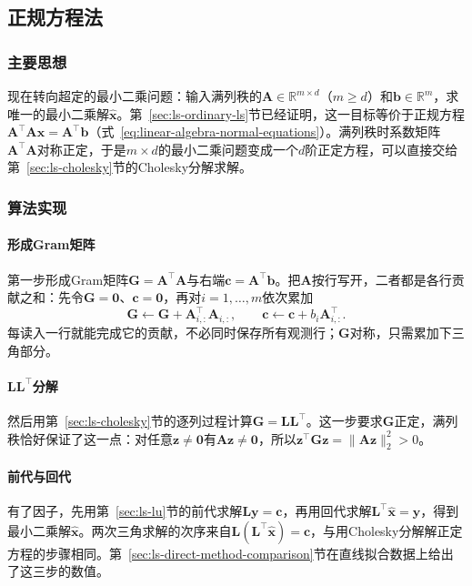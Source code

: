 \subsection{正规方程法}
\label{sec:ls-normal-equations-method}

\subsubsection{主要思想}

现在转向超定的最小二乘问题：输入满列秩的$\bm A\in\mathbb R^{m\times d}$（$m\geq d$）和$\bm b\in\mathbb R^m$，求唯一的最小二乘解$\hat{\bm x}$。第~\ref{sec:ls-ordinary-ls}节已经证明，这一目标等价于正规方程$\bm A^\top\bm A\hat{\bm x}=\bm A^\top\bm b$（式~\eqref{eq:linear-algebra-normal-equations}）。满列秩时系数矩阵$\bm A^\top\bm A$对称正定，于是$m\times d$的最小二乘问题变成一个$d$阶正定方程，可以直接交给第~\ref{sec:ls-cholesky}节的Cholesky分解求解。

\subsubsection{算法实现}

\paragraph{形成Gram矩阵}
第一步形成Gram矩阵$\bm G=\bm A^\top\bm A$与右端$\bm c=\bm A^\top\bm b$。把$\bm A$按行写开，二者都是各行贡献之和：先令$\bm G=\bm0$、$\bm c=\bm0$，再对$i=1,\ldots,m$依次累加
\[
 \bm G\leftarrow\bm G+\bm A_{i,:}^\top\bm A_{i,:},\qquad
 \bm c\leftarrow\bm c+b_i\bm A_{i,:}^\top .
\]
每读入一行就能完成它的贡献，不必同时保存所有观测行；$\bm G$对称，只需累加下三角部分。

\paragraph{\texorpdfstring{$\bm L\bm L^\top$}{LL\textasciicircum T}分解}
然后用第~\ref{sec:ls-cholesky}节的逐列过程计算$\bm G=\bm L\bm L^\top$。这一步要求$\bm G$正定，满列秩恰好保证了这一点：对任意$\bm z\neq\bm0$有$\bm A\bm z\neq\bm0$，所以$\bm z^\top\bm G\bm z=\lVert\bm A\bm z\rVert_2^2>0$。

\paragraph{前代与回代}
有了因子，先用第~\ref{sec:ls-lu}节的前代求解$\bm L\bm y=\bm c$，再用回代求解$\bm L^\top\hat{\bm x}=\bm y$，得到最小二乘解$\hat{\bm x}$。两次三角求解的次序来自$\bm L(\bm L^\top\hat{\bm x})=\bm c$，与用Cholesky分解解正定方程的步骤相同。第~\ref{sec:ls-direct-method-comparison}节在直线拟合数据上给出了这三步的数值。

